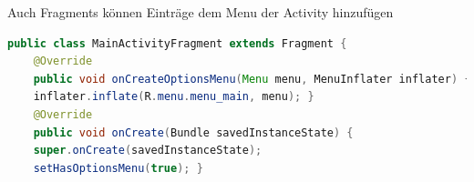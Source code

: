 Auch Fragments können Einträge dem Menu der Activity hinzufügen
\begin{lstlisting}[language=java]
public class MainActivityFragment extends Fragment {
    @Override
    public void onCreateOptionsMenu(Menu menu, MenuInflater inflater) {
    inflater.inflate(R.menu.menu_main, menu); }
    @Override
    public void onCreate(Bundle savedInstanceState) {
    super.onCreate(savedInstanceState);
    setHasOptionsMenu(true); }
\end{lstlisting}


